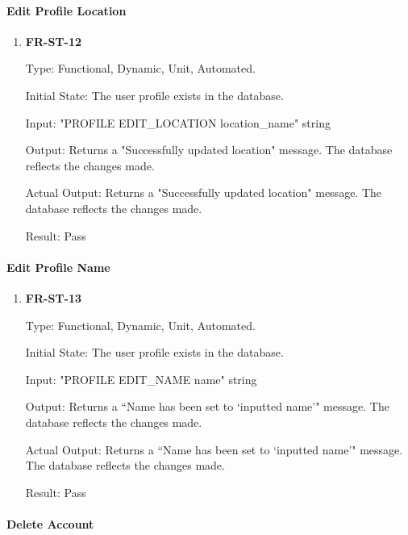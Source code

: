 \documentclass[12pt, titlepage]{article}
\begin{document}
\paragraph{Edit Profile Location}

\begin{enumerate}

\item{\textbf{FR-ST-12}}

Type: Functional, Dynamic, Unit, Automated.
					
Initial State: The user profile exists in the database.
					
Input: "PROFILE EDIT\_LOCATION location\_name" string
					
Output: Returns a "Successfully updated location" message. The database reflects the changes made. 

Actual Output: Returns a "Successfully updated location" message. The database reflects the changes made. 
					
Result: Pass
\end{enumerate}

\paragraph{Edit Profile Name}

\begin{enumerate}

\item{\textbf{FR-ST-13}}

Type: Functional, Dynamic, Unit, Automated.
					
Initial State: The user profile exists in the database.
					
Input: "PROFILE EDIT\_NAME name" string
					
Output: Returns a ``Name has been set to `inputted name'" message. The database reflects the changes made. 


Actual Output: Returns a ``Name has been set to `inputted name'" message. The database reflects the changes made. 
					
Result: Pass
\end{enumerate}

\paragraph{Delete Account}
\end{document}
